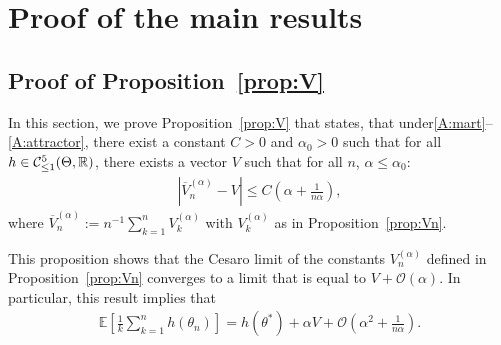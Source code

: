 \documentclass{article}
\newcommand{\R}{\mathbb{R}}
\newcommand\E{\mathbb{E}}
\newcommand\esp[1]{\E\left[#1\right]}
\newcommand\abs[1]{\left|#1\right|}
\newcommand\toA{^{(\alpha)}}
\newcommand\bO[1]{\mathcal{O}(#1)}
\newcommand\cont[3][]{\mathcal{C}^{#2}_{\ifthenelse{\equal{#1}{all}}{}{\le1}}(#3,\R)}
\begin{document}
\section{Proof of the main results}
\label{apx:proof_theorems}

\subsection{Proof of Proposition~\ref{prop:V}}
\label{ssec:proof_prop:V}

In this section, we prove Proposition~\ref{prop:V} that states, that under\ref{A:mart}--\ref{A:attractor}, there exist a constant $C>0$ and $\alpha_0>0$ such that for all $h\in\cont{5}{\Theta}$, there exists a vector $V$ such that for all $n$, $\alpha\le\alpha_0$:
\begin{align*}
    \abs{\overline{V}\toA_n - V} \le C(\alpha + \frac1{n\alpha}),
\end{align*}
where $\overline{V}\toA_n := n^{-1}\sum_{k=1}^{n}V\toA_k$ with $V\toA_k$ as in Proposition~\ref{prop:Vn}.

This proposition shows that the Cesaro limit of the constants $V\toA_{n}$ defined in Proposition~\ref{prop:Vn} converges to a limit that is equal to $V+\bO{\alpha}$. In particular, this result implies that
\begin{align*}
    \esp{\frac1k\sum_{k=1}^n h(\theta_n)} = h(\theta^*) + \alpha V + \bO{\alpha^2 + \frac{1}{n\alpha}}.
\end{align*}
\end{document}
